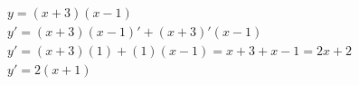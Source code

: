 \begin{ex}
\begin{align}
&y=(x+3)(x-1)\nonumber\\
&y'=(x+3)(x-1)'+(x+3)'(x-1)\nonumber\\
&y'=(x+3)(1)+(1)(x-1)=x+3+x-1=2x+2\nonumber\\
&y'=2(x+1)\nonumber
\end{align}
\end{ex}